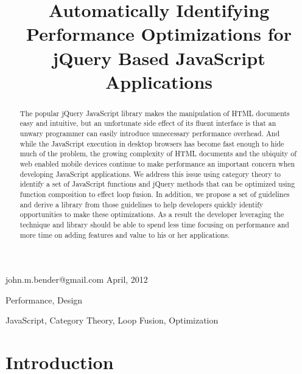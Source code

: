 \documentclass[preprint]{sigplanconf}
\begin{document}
\copyrightdata{[to be supplied]}


\title{Automatically Identifying Performance Optimizations for jQuery Based JavaScript Applications}

           {john.m.bender@gmail.com}
           {April, 2012}

\maketitle

\begin{abstract}
The popular \cite{bib:usage} jQuery JavaScript library makes the manipulation of HTML documents easy and intuitive, but an unfortunate side effect of its fluent interface is that an unwary programmer can easily introduce unnecessary performance overhead. And while the JavaScript execution in desktop browsers has become fast enough to hide much of the problem, the growing complexity of HTML documents and the ubiquity of web enabled mobile devices continue to make performance an important concern when developing JavaScript applications. We address this issue using category theory to identify a set of JavaScript functions and jQuery methods that can be optimized using function composition to effect loop fusion. In addition, we propose a set of guidelines and derive a library from those guidelines to help developers quickly identify opportunities to make these optimizations. As a result the developer leveraging the technique and library should be able to spend less time focusing on performance and more time on adding features and value to his or her applications.
\end{abstract}


\terms
Performance, Design

\keywords
JavaScript, Category Theory, Loop Fusion, Optimization

\section{Introduction}
\end{document}
